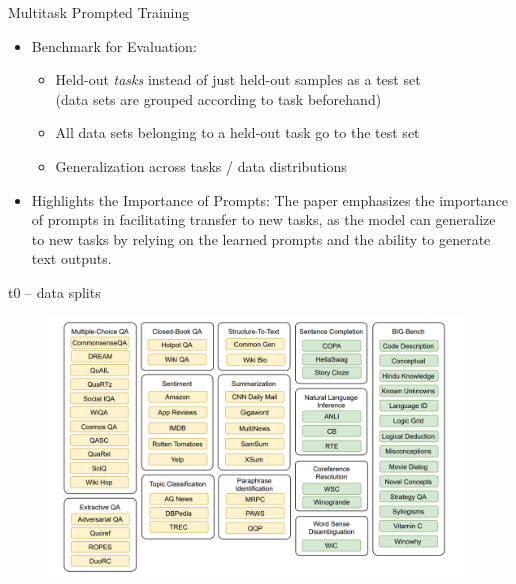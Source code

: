 \begin{frame}{Multitask Prompted Training}

\vfill

\begin{itemize}
    \item Benchmark for Evaluation:
        \begin{itemize}
            \item Held-out \textit{tasks} instead of just held-out samples as a test set\\
            (data sets are grouped according to task beforehand)
            \item All data sets belonging to a held-out task go to the test set
            \item Generalization across tasks / data distributions
        \end{itemize}
    \item Highlights the Importance of Prompts: The paper
        emphasizes the importance of prompts in facilitating
        transfer to new tasks, as the model can generalize to new tasks by relying on the learned prompts and the ability to generate text outputs.
\end{itemize}

\vfill

\end{frame}


\begin{frame}{t0 -- data splits}

\vfill
	
	\begin{figure}
		\centering
		\includegraphics[width = 11cm]{figure/81-t0-data.png}\\ 
	\end{figure}

\vfill

\end{frame}

